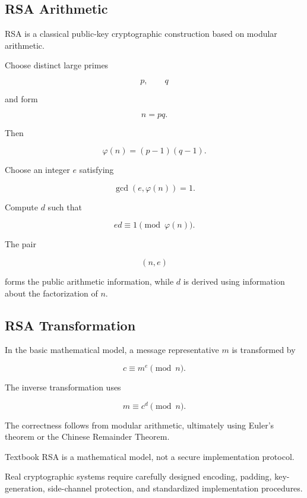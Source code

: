 \subsection{RSA Arithmetic}
\label{subsec:rsa-arithmetic}

RSA is a classical public-key cryptographic construction based on modular
arithmetic.

Choose distinct large primes

\[ p,\qquad q \]

and form

\[ n=pq. \]

Then

\[ \varphi(n)=(p-1)(q-1). \]

Choose an integer \(e\) satisfying

\[ \gcd(e,\varphi(n))=1. \]

Compute \(d\) such that

\[ ed\equiv1\pmod{\varphi(n)}. \]

The pair

\[ (n,e) \]

forms the public arithmetic information, while \(d\) is derived using
information about the factorization of \(n\).

\subsection{RSA Transformation}
\label{subsec:rsa-transformation}

In the basic mathematical model, a message representative \(m\) is
transformed by

\[ c\equiv m^e\pmod n. \]

The inverse transformation uses

\[ m\equiv c^d\pmod n. \]

The correctness follows from modular arithmetic, ultimately using Euler's
theorem or the Chinese Remainder Theorem.

\begin{warningbox}
Textbook RSA is a mathematical model, not a secure implementation protocol.

Real cryptographic systems require carefully designed encoding, padding,
key-generation, side-channel protection, and standardized implementation
procedures.
\end{warningbox}

